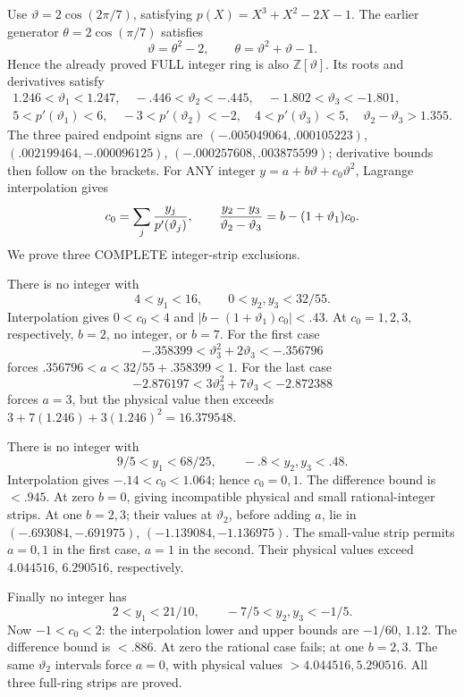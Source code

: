 Use \(\vartheta=2\cos(2\pi/7)\), satisfying
\(p(X)=X^3+X^2-2X-1\).
The earlier generator \(\theta=2\cos(\pi/7)\)
satisfies
\[
           \vartheta=\theta^2-2,\qquad
           \theta=\vartheta^2+\vartheta-1 .
\]
Hence the already proved FULL integer ring
is also \(\mathbb Z[\vartheta]\).
Its roots and derivatives satisfy
\[
\begin{gathered}
 1.246<\vartheta_1<1.247,\quad
 -.446<\vartheta_2<-.445,\quad
 -1.802<\vartheta_3<-1.801,\\
 5<p'(\vartheta_1)<6,\quad-3<p'(\vartheta_2)<-2,\quad
 4<p'(\vartheta_3)<5,\quad\vartheta_2-\vartheta_3>1.355 .
\end{gathered}
\]
The three paired endpoint signs are
\((-.005049064,.000105223)\),
\((.002199464,-.000096125)\),
\((-.000257608,.003875599)\);
derivative bounds then follow on the brackets.
For ANY integer \(y=a+b\vartheta+c_0\vartheta^2\),
Lagrange interpolation gives
\[
 c_0=\sum_j{y_j\over p'(\vartheta_j)},\qquad
 {y_2-y_3\over\vartheta_2-\vartheta_3}
                 =b-(1+\vartheta_1)c_0 .
\]
We prove three COMPLETE integer-strip exclusions.

There is no integer with
\[
              4<y_1<16,\qquad0<y_2,y_3<32/55 .
\tag{A15stripA}\label{eq:arithA15typedstripA}
\]
Interpolation gives \(0<c_0<4\) and
\(|b-(1+\vartheta_1)c_0|<.43\).
At \(c_0=1,2,3\), respectively,
\(b=2\), no integer, or \(b=7\).
For the first case
\[
          -.358399<\vartheta_3^2+2\vartheta_3<-.356796
\]
forces \(.356796<a<32/55+.358399<1\).
For the last case
\[
           -2.876197<3\vartheta_3^2+7\vartheta_3<-2.872388
\]
forces \(a=3\), but the physical value then
exceeds \(3+7(1.246)+3(1.246)^2=16.379548\).

There is no integer with
\[
                9/5<y_1<68/25,\qquad-.8<y_2,y_3<.48 .
\tag{A15stripB}\label{eq:arithA15typedstripB}
\]
Interpolation gives \(-.14<c_0<1.064\);
hence \(c_0=0,1\).
The difference bound is \(<.945\).
At zero \(b=0\), giving incompatible
physical and small rational-integer strips.
At one \(b=2,3\); their values at
\(\vartheta_2\), before adding \(a\), lie in
\((-.693084,-.691975)\),
\((-1.139084,-1.136975)\).
The small-value strip permits \(a=0,1\)
in the first case, \(a=1\) in the second.
Their physical values exceed \(4.044516\),
\(6.290516\), respectively.

Finally no integer has
\[
                   2<y_1<21/10,\qquad-7/5<y_2,y_3<-1/5 .
\tag{A15stripC}\label{eq:arithA15typedstripC}
\]
Now \(-1<c_0<2\):
the interpolation lower and upper bounds
are \(-1/60\), \(1.12\).
The difference bound is \(<.886\).
At zero the rational case fails;
at one \(b=2,3\).
The same \(\vartheta_2\) intervals force
\(a=0\), with physical values
\(>4.044516,5.290516\).
All three full-ring strips are proved.


